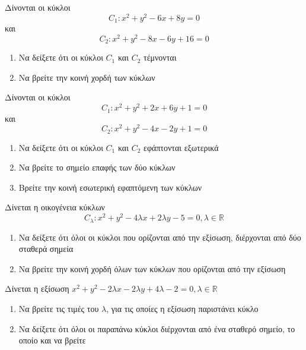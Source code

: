 \documentclass{presentation}
\begin{document}
\begin{askisi}
  Δίνονται οι κύκλοι
  $$C_1:x^2+y^2-6x+8y=0$$
  και
  $$C_2:x^2+y^2-8x-6y+16=0$$
  \begin{enumerate}
    \item<1-> Να δείξετε ότι οι κύκλοι $C_1$ και $C_2$ τέμνονται
    \item<2-> Να βρείτε την κοινή χορδή των κύκλων
  \end{enumerate}

\end{askisi}

\begin{askisi}
  Δίνονται οι κύκλοι
  $$C_1:x^2+y^2+2x+6y+1=0$$
  και
  $$C_2:x^2+y^2-4x-2y+1=0$$
  \begin{enumerate}
    \item<1-> Να δείξετε ότι οι κύκλοι $C_1$ και $C_2$ εφάπτονται εξωτερικά
    \item<2-> Να βρείτε το σημείο επαφής των δύο κύκλων
    \item<3-> Βρείτε την κοινή εσωτερική εφαπτόμενη των κύκλων
  \end{enumerate}

\end{askisi}

\begin{askisi}
  Δίνεται η οικογένεια κύκλων
  $$C_λ:x^2+y^2-4λx+2λy-5=0,λ\in\mathbb{R}$$
  \begin{enumerate}
    \item<1-> Να δείξετε ότι όλοι οι κύκλοι που ορίζονται από την εξίσωση, διέρχονται από δύο σταθερά σημεία
    \item<2-> Να βρείτε την κοινή χορδή όλων των κύκλων που ορίζονται από την εξίσωση
  \end{enumerate}

\end{askisi}

\begin{askisi}
  Δίνεται η εξίσωση $x^2+y^2-2λx-2λy+4λ-2=0,λ\in\mathbb{R}$
  \begin{enumerate}
    \item<1-> Να βρείτε τις τιμές του $λ$, για τις οποίες η εξίσωση παριστάνει κύκλο
    \item<2-> Να δείξετε ότι όλοι οι παραπάνω κύκλοι διέρχονται από ένα σταθερό σημείο, το οποίο και να βρείτε
  \end{enumerate}

\end{askisi}
\end{document}
